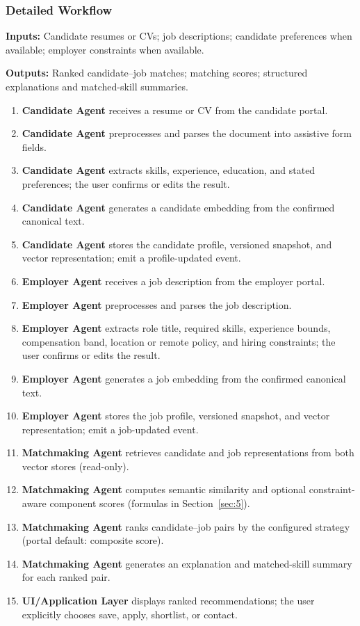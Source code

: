 \subsubsection*{Detailed Workflow}\label{workflow:matching}

\small
\noindent\textbf{Inputs:}
Candidate resumes or CVs; job descriptions; candidate preferences when available; employer constraints when available.

\noindent\textbf{Outputs:}
Ranked candidate--job matches; matching scores; structured explanations and matched-skill summaries.

\begin{enumerate}[label=\roman*., leftmargin=1.6em, itemsep=0.12em, topsep=0.2em]
  \item \textbf{Candidate Agent} receives a resume or CV from the candidate portal.
  \item \textbf{Candidate Agent} preprocesses and parses the document into assistive form fields.
  \item \textbf{Candidate Agent} extracts skills, experience, education, and stated preferences; the user confirms or edits the result.
  \item \textbf{Candidate Agent} generates a candidate embedding from the confirmed canonical text.
  \item \textbf{Candidate Agent} stores the candidate profile, versioned snapshot, and vector representation; emit a profile-updated event.
  \item \textbf{Employer Agent} receives a job description from the employer portal.
  \item \textbf{Employer Agent} preprocesses and parses the job description.
  \item \textbf{Employer Agent} extracts role title, required skills, experience bounds, compensation band, location or remote policy, and hiring constraints; the user confirms or edits the result.
  \item \textbf{Employer Agent} generates a job embedding from the confirmed canonical text.
  \item \textbf{Employer Agent} stores the job profile, versioned snapshot, and vector representation; emit a job-updated event.
  \item \textbf{Matchmaking Agent} retrieves candidate and job representations from both vector stores (read-only).
  \item \textbf{Matchmaking Agent} computes semantic similarity and optional constraint-aware component scores (formulas in Section~\ref{sec:5}).
  \item \textbf{Matchmaking Agent} ranks candidate--job pairs by the configured strategy (portal default: composite score).
  \item \textbf{Matchmaking Agent} generates an explanation and matched-skill summary for each ranked pair.
  \item \textbf{UI/Application Layer} displays ranked recommendations; the user explicitly chooses save, apply, shortlist, or contact.
\end{enumerate}
\normalsize